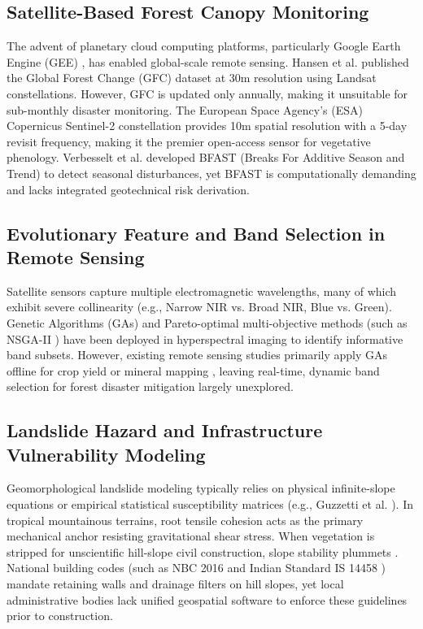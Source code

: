 \documentclass[conference]{IEEEtran}
\begin{document}
\subsection{Satellite-Based Forest Canopy Monitoring}
The advent of planetary cloud computing platforms, particularly Google Earth Engine (GEE) \cite{gorelick2017google}, has enabled global-scale remote sensing. Hansen et al. \cite{hansen2013high} published the Global Forest Change (GFC) dataset at 30m resolution using Landsat constellations. However, GFC is updated only annually, making it unsuitable for sub-monthly disaster monitoring. The European Space Agency's (ESA) Copernicus Sentinel-2 constellation \cite{drusch2012sentinel} provides 10m spatial resolution with a 5-day revisit frequency, making it the premier open-access sensor for vegetative phenology. Verbesselt et al. \cite{verbesselt2010detecting} developed BFAST (Breaks For Additive Season and Trend) to detect seasonal disturbances, yet BFAST is computationally demanding and lacks integrated geotechnical risk derivation.

\subsection{Evolutionary Feature and Band Selection in Remote Sensing}
Satellite sensors capture multiple electromagnetic wavelengths, many of which exhibit severe collinearity (e.g., Narrow NIR vs. Broad NIR, Blue vs. Green). Genetic Algorithms (GAs) and Pareto-optimal multi-objective methods (such as NSGA-II \cite{deb2002fast}) have been deployed in hyperspectral imaging to identify informative band subsets. However, existing remote sensing studies primarily apply GAs offline for crop yield or mineral mapping \cite{delegido2011green}, leaving real-time, dynamic band selection for forest disaster mitigation largely unexplored.

\subsection{Landslide Hazard and Infrastructure Vulnerability Modeling}
Geomorphological landslide modeling typically relies on physical infinite-slope equations or empirical statistical susceptibility matrices (e.g., Guzzetti et al. \cite{guzzetti1999landslide}). In tropical mountainous terrains, root tensile cohesion acts as the primary mechanical anchor resisting gravitational shear stress. When vegetation is stripped for unscientific hill-slope civil construction, slope stability plummets \cite{gsi2024wayanad}. National building codes (such as NBC 2016 and Indian Standard IS 14458 \cite{is14458}) mandate retaining walls and drainage filters on hill slopes, yet local administrative bodies lack unified geospatial software to enforce these guidelines prior to construction.
\end{document}

